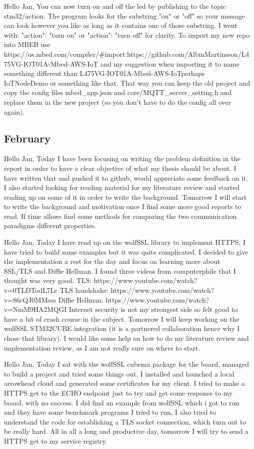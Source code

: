 Hello Jan,
You can now turn on and off  the led by publishing to the topic stm32/action. The program looks for the substring "on" or "off" so your message can look however you like
as long as it contains one of those substring. I went with:
{
       "action": "turn on"
}
or
{
       "action": "turn off"
}
for clarity.
To import my new repo into MBEB use https://os.mbed.com/compiler/#import:https://github.com/AlbinMartinsson/L475VG-IOT01A-Mbed-AWS-IoT
and my suggestion when importing it to name something different than L475VG-IOT01A-Mbed-AWS-IoTperhaps IoTNodeDemo or something like that. 
That way you can keep the old project and
copy the config files mbed_app.json and core/MQTT_server_setting.h and replace them in the new project (so you don't have to do the config all over again).

\subsection{February}

Hello Jan,
Today I have been focusing on writing the problem definition in the report in order to have a
clear objective of what my thesis should be about. I have written that and pushed it to github, would appreciate some feedback on it. I also 
started looking for reading material for my literature review and started reading up on some of it in order to write the background.
Tomorrow I will start to write the background and motivation once I find some more good reports to
read. If time allows find some methods for comparing the two communication paradigms different properties.

Hello Jan,
Today I have read up on the wolfSSL library to implement HTTPS, I have tried to build some examples but it was quite complicated. 
I decided to give the implementation a rest for the day and focus on learning more about SSL/TLS and Diffie Hellman. I found three videos from computerphile that 
I thought was very good.
TLS: https://www.youtube.com/watch?v=0TLDTodL7Lc
TLS handshake: https://www.youtube.com/watch?v=86cQJ0MMses
Diffie Hellman: https://www.youtube.com/watch?v=NmM9HA2MQGI
Internet security is not my strongest side so felt good to have a bit of crash course in the subject.
Tomorrow I will keep working on the wolfSSL STM32CUBE integration (it is a partnered collaboration hence why I chose that library).
I would like some help on how to do my literature review and implementation review, as I am not really sure on where to start. 

Hello Jan,
Today I sat with the wolfSSL cubemx package for the board, managed to build a project and tried some things out. I  installed and launched a local arrowhead 
cloud and generated some certificates for my client. I tried to make a HTTPS get to the ECHO endpoint just to try and get some response to my board, with no success.
I did find an example from wolfSSL which i got to run and they have some benchmark programs I tried to run, I also tried to understand the code for 
establishing a TLS socket connection, which turn out to be really hard. All in all a long and productive day, tomorrow I will try to send a HTTPS get to my service registry.

